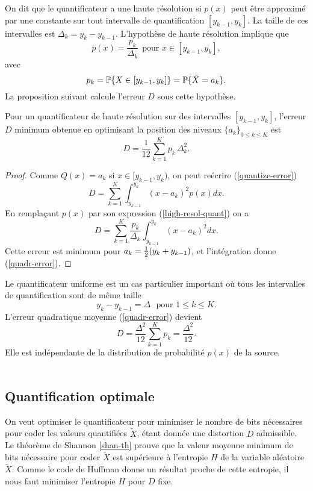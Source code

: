 On dit que le quantificateur a une haute
r\'esolution si
$p(x)$ peut \^etre approxim\'e par une constante sur tout intervalle
de quantification $[{y_{k-1}},{y_{k}}]$.
La taille de ces intervalles est $\Delta_k = y_k - y_{k-1}$.
L'hypoth\`ese de haute r\'esolution implique que
\begin{equation}
\label{high-resol-quant}
p(x) = \frac {p_k} {\Delta_k} ~~\mbox{pour $x \in [y_{k-1},{y_{k}}]$},
\end{equation}
avec
\[
p_k = \mathbb{P} \{X \in [{y_{k-1}},y_{k}] \} = \mathbb{P} \{ \tilde X = a_k \} .
\]
La proposition suivant calcule l'erreur $D$ sous cette hypoth\`ese.

\begin{proposition}
Pour un quantificateur de haute r\'esolution sur des intervalles
$[{y_{k-1}},{y_{k}}]$, l'erreur $D$
minimum obtenue en optimisant la position des niveaux
$\{ a_k \}_{0 \leq k \leq K}$ est
\begin{equation}
\label{quadr-error}
D = \frac 1 {12} \sum_{k=1}^{K} {p_k} \, {\Delta_k ^2} .
\end{equation}
\end{proposition}
\begin{proof} 
Comme $Q(x) = a_k$ si
$x \in [y_{k-1},y_k)$, on peut re\'ecrire (\ref{quantize-error})
\[
D = \sum_{k=1}^{K} \int_{y_{k-1}}^{y_{k}} (x - a_k)^2 p(x) dx .
\]
En rempla\c{c}ant $p(x)$ par son expression
(\ref{high-resol-quant}) on a
\begin{equation}
D =
\sum_{k=1}^{K} \frac {p_k} {\Delta_k}
\int_{y_{k-1}}^{y_{k}} (x - a_k)^2  dx.
\end{equation}
Cette erreur est minimum
pour $a_k = {\frac 1 2} (y_{k}+{y_{k-1}})$, et l'int\'egration donne
(\ref{quadr-error}).
\end{proof}

Le quantificateur uniforme est un cas particulier important o\`u
tous les intervalles de quantification sont de m\^eme taille
\[
y_{k} - y_{k-1} = \Delta ~~~\mbox{pour $1 \leq k \leq K$} .
\]
L'erreur quadratique moyenne (\ref{quadr-error})
devient
\begin{equation}
\label{unifoquantiz}
D = \frac {\Delta^2} {12} \sum_{k=1}^{K} {p_k}
= \frac {\Delta^2} {12} .
\end{equation}
Elle est ind\'ependante de la distribution de probabilit\'e
$p(x)$ de la source.
\\
\\
\subsection{Quantification optimale}
On veut optimiser
le quantificateur pour minimiser le nombre de bits
n\'ecessaires pour coder les valeurs quantifi\'ees
$\tilde X$, \'etant donn\'ee une distortion $D$ admissible.
Le th\'eor\`eme de
Shannon \ref{shan-th} prouve que la valeur moyenne minimum de bits
n\'ecessaire pour coder $\tilde X$ est sup\'erieure \`a l'entropie $H$
de la variable al\'eatoire $\tilde X$.
Comme le
code de Huffman donne un r\'esultat proche de cette entropie,
il nous faut minimiser l'entropie $H$ pour $D$ fixe.

